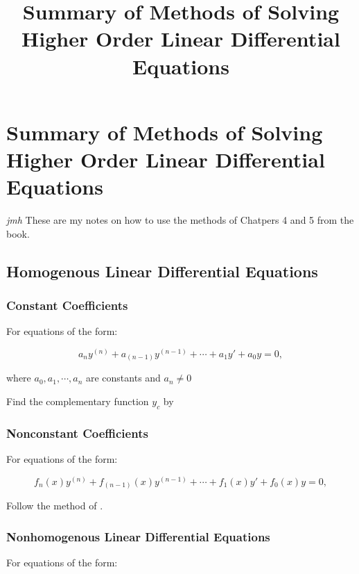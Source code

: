 \documentclass{article}
\title{Summary of Methods of Solving Higher Order Linear Differential Equations}
\begin{document}
\section{Summary of Methods of Solving Higher Order Linear Differential Equations}

\emph{jmh} These are my notes on how to use the methods of Chatpers 4 and 5 from the book.

\subsection{Homogenous Linear Differential Equations}

\subsubsection{Constant Coefficients}

For equations of the form:

\[ a_ny^{(n)} + a_{(n-1)}y^{(n-1)} + \cdots + a_1y' + a_0y = 0, \]

where $a_0,a_1,\cdots,a_n$ are constants and $a_n \neq 0$

Find the complementary function $y_c$ by 

\subsubsection{Nonconstant Coefficients}

For equations of the form:

\[ f_n(x)y^{(n)} + f_{(n-1)}(x)y^{(n-1)} + \cdots + f_1(x)y' + f_0(x)y = 0, \]

Follow the method of .

\subsubsection{Nonhomogenous Linear Differential Equations}

For equations of the form:
\end{document}
